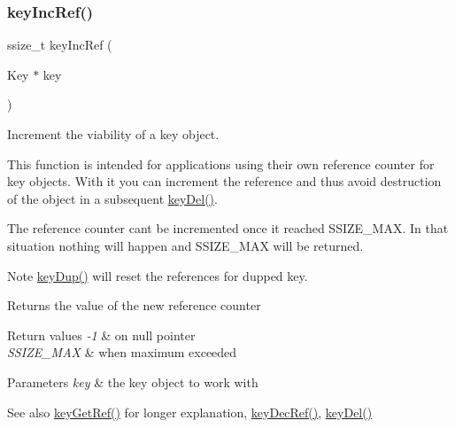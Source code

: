 \subsubsection{\texorpdfstring{key\+Inc\+Ref()}{keyIncRef()}}
{\footnotesize\ttfamily ssize\+\_\+t key\+Inc\+Ref (\begin{DoxyParamCaption}\item[{Key $\ast$}]{key }\end{DoxyParamCaption})}



Increment the viability of a key object. 

This function is intended for applications using their own reference counter for key objects. With it you can increment the reference and thus avoid destruction of the object in a subsequent \hyperlink{group__key_ga3df95bbc2494e3e6703ece5639be5bb1}{key\+Del()}.

The reference counter can\textquotesingle{}t be incremented once it reached S\+S\+I\+Z\+E\+\_\+\+M\+AX. In that situation nothing will happen and S\+S\+I\+Z\+E\+\_\+\+M\+AX will be returned.

\begin{DoxyNote}{Note}
\hyperlink{group__key_gae6ec6a60cc4b8c1463fa08623d056ce3}{key\+Dup()} will reset the references for dupped key.
\end{DoxyNote}
\begin{DoxyReturn}{Returns}
the value of the new reference counter 
\end{DoxyReturn}

\begin{DoxyRetVals}{Return values}
{\em -\/1} & on null pointer \\
\hline
{\em S\+S\+I\+Z\+E\+\_\+\+M\+AX} & when maximum exceeded \\
\hline
\end{DoxyRetVals}

\begin{DoxyParams}{Parameters}
{\em key} & the key object to work with \\
\hline
\end{DoxyParams}
\begin{DoxySeeAlso}{See also}
\hyperlink{group__key_ga4aabc4272506dd63161db2bbb42de8ae}{key\+Get\+Ref()} for longer explanation, \hyperlink{group__key_ga2c6433ca22109e4e141946057eccb283}{key\+Dec\+Ref()}, \hyperlink{group__key_ga3df95bbc2494e3e6703ece5639be5bb1}{key\+Del()} 
\end{DoxySeeAlso}
\mbox{\label{group__key_ga769882e86e34a95cefcf8f260ef97e06}} 

